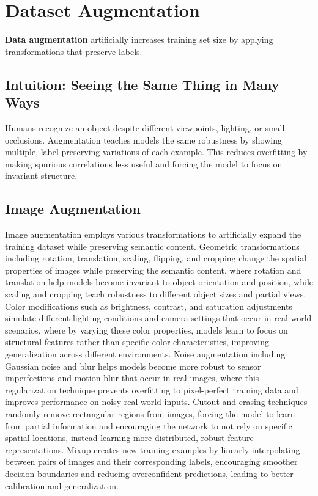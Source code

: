 
\section{Dataset Augmentation }
\label{sec:data-augmentation}

\textbf{Data augmentation} artificially increases training set size by applying transformations that preserve labels.

\subsection{Intuition: Seeing the Same Thing in Many Ways}

Humans recognize an object despite different viewpoints, lighting, or small occlusions. Augmentation teaches models the same robustness by showing multiple, label-preserving variations of each example. This reduces overfitting by making spurious correlations less useful and forcing the model to focus on invariant structure.

\subsection{Image Augmentation}

Image augmentation employs various transformations to artificially expand the training dataset while preserving semantic content. Geometric transformations including rotation, translation, scaling, flipping, and cropping change the spatial properties of images while preserving the semantic content, where rotation and translation help models become invariant to object orientation and position, while scaling and cropping teach robustness to different object sizes and partial views. Color modifications such as brightness, contrast, and saturation adjustments simulate different lighting conditions and camera settings that occur in real-world scenarios, where by varying these color properties, models learn to focus on structural features rather than specific color characteristics, improving generalization across different environments. Noise augmentation including Gaussian noise and blur helps models become more robust to sensor imperfections and motion blur that occur in real images, where this regularization technique prevents overfitting to pixel-perfect training data and improves performance on noisy real-world inputs. Cutout and erasing techniques randomly remove rectangular regions from images, forcing the model to learn from partial information and encouraging the network to not rely on specific spatial locations, instead learning more distributed, robust feature representations. Mixup creates new training examples by linearly interpolating between pairs of images and their corresponding labels, encouraging smoother decision boundaries and reducing overconfident predictions, leading to better calibration and generalization.

